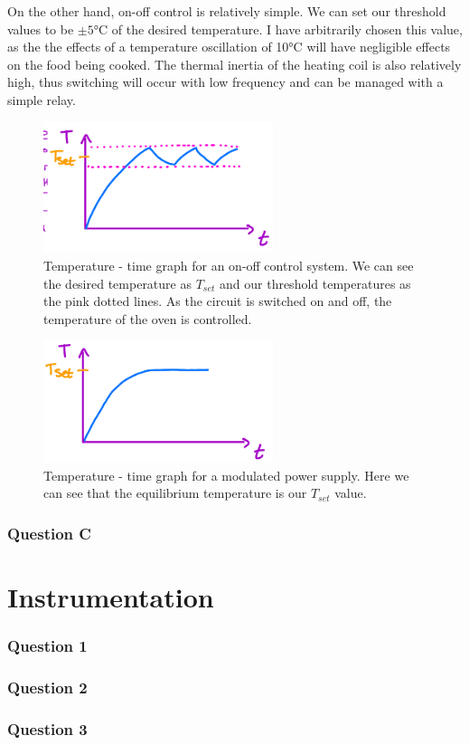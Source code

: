 \documentclass[12pt]{article}
\numberwithin{equation}{section}
\begin{document}
On the other hand, on-off control is relatively simple. We can set our threshold values to be $\pm 5\si{\celsius}$ of the desired temperature. I have arbitrarily chosen this value, as the the effects of a temperature oscillation of 10\si{\celsius} will have negligible effects on the food being cooked. The thermal inertia of the heating coil is also relatively high, thus switching will occur with low frequency and can be managed with a simple relay.
\begin{figure}[H]
  \centering
  \includegraphics[width=0.6\textwidth]{./img/2-2graph.png}
  \caption{Temperature - time graph for an on-off control system. We can see the desired temperature as $T_{set}$ and our threshold temperatures as the pink dotted lines. As the circuit is switched on and off, the temperature of the oven is controlled.}
\end{figure}
\begin{figure}[H]
  \centering
  \includegraphics[width=0.6\textwidth]{./img/2-3graph.png}
  \caption{Temperature - time graph for a modulated power supply. Here we can see that the equilibrium temperature is our $T_{set}$ value.}
\end{figure}
\section{Question C}
\part{Instrumentation}
\section{Question 1}
\section{Question 2}
\section{Question 3}
\end{document}
